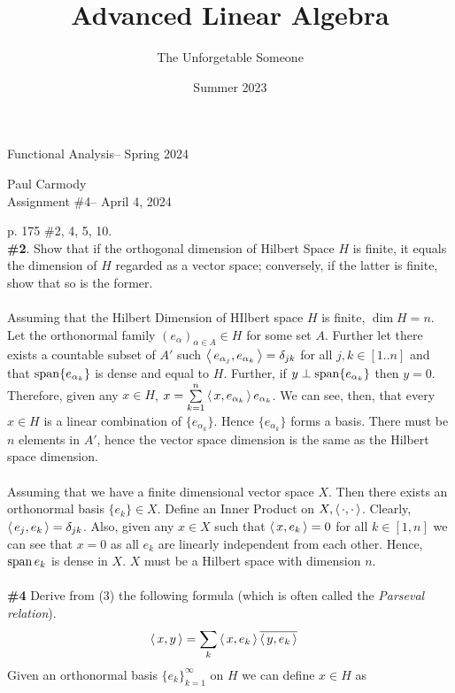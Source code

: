 \documentclass[10pt,a4paper]{report}
\title{Advanced Linear Algebra}
\author{The Unforgetable Someone}
\date{Summer 2023}
\newcommand{\CLASSNAME}{Functional Analysis}
\newcommand{\STUDENTNAME}{Paul Carmody}
\newcommand{\ASSIGNMENT}{Assignment \#4}
\newcommand{\DUEDATE}{April 4, 2024}
\newcommand{\SEMESTER}{Spring 2024}
\begin{document}
\begin{center}
	\Large{\CLASSNAME -- \SEMESTER} \\
\end{center}
\begin{center}
	\STUDENTNAME \\
	\ASSIGNMENT -- \DUEDATE\\
\end{center} 

\noindent p. 175 \#2, 4, 5, 10. \\

\noindent \textbf{\#2}.  Show that if the orthogonal dimension of Hilbert Space $H$ is finite, it equals the dimension of $H$ regarded as a vector space; conversely, if the latter is finite, show that so is the former.\\
\\
Assuming that the Hilbert Dimension of HIlbert space $H$ is finite, $\dim H = n$.  Let the orthonormal family $(e_\alpha)_{\alpha \in A}\in H$ for some set $A$.  Further let there exists a countable subset of $A'$ such $\left \langle\, e_{\alpha_j},e_{\alpha_k} \,\right \rangle = \delta_{jk}$ for all $j,k \in [1..n]$ and that $\operatorname{span}\{e_{\alpha_k}\}$ is dense and equal to $H$.  Further, if $y \perp \operatorname{span}\{e_{\alpha_k}\}$ then $y = 0$. Therefore, given any $x \in H$, $x = \underset{k=1}{\overset{n}{\sum}} \left \langle\, x,e_{\alpha_k} \,\right \rangle e_{\alpha_k}$.  We can see, then, that every $x\in H$ is a linear combination of $\{e_{\alpha_k}\}$.  Hence $\{ e_{\alpha_k}\}$ forms a basis.  There must be $n$ elements in $A'$, hence the vector space dimension is the same as the Hilbert space dimension.\\
\\
Assuming that we have a finite dimensional vector space $X$.  Then there exists an orthonormal basis $\{e_k\} \in X$.  Define an Inner Product on $X, \left \langle\, \cdot,\cdot \,\right \rangle$.  Clearly, $\left \langle\, e_j,e_k \,\right \rangle = \delta_{jk}$.  Also, given any $x \in X$ such that $\left \langle\, x, e_k \,\right \rangle=0$ for all $k\in [1,n]$ we can see that $x=0$ as all $e_k$ are linearly independent from each other.  Hence, $\operatorname{span}{e_k}$ is dense in $X$.  $X$ must be a Hilbert space with dimension $n$.\\
\\
\noindent \textbf{\#4} Derive from (3) the following formula (which is often called the \textit{Parseval relation}).
\begin{align*}
	\left \langle\, x,y \,\right \rangle &= \sum_k \left \langle\, x,e_k \,\right \rangle\overline{\left \langle\, y,e_k \,\right \rangle}
\end{align*}
Given an orthonormal basis $\{e_k\}_{k=1}^\infty$ on $H$ we can define $x \in H$ as
\end{document}
